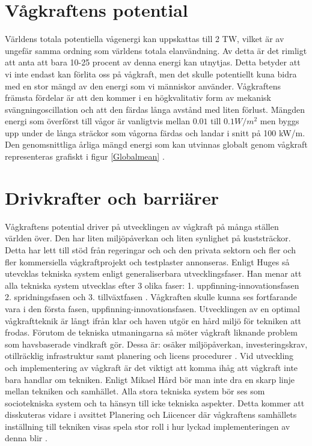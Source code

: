\documentclass[10pt,a4paper,oneside]{article}
\begin{document}
\section{Vågkraftens potential}
Världens totala potentiella vågenergi kan uppskattas till 2 TW, vilket är av ungefär samma ordning som världens totala elanvändning. Av detta är det rimligt att anta att bara 10-25 procent av denna energi kan utnytjas. Detta betyder att vi inte endast kan förlita oss på vågkraft, men det skulle potentiellt kuna bidra med en stor mängd av den energi som vi människor använder. Vågkraftens främsta fördelar är att den kommer i en högkvalitativ form av mekanisk svängningoscillation och att den färdas långa avstånd med liten förlust. Mängden energi som överförst till vågor är vanligtvis mellan \begin{math} 0.01  \end{math} till \begin{math} 0.1 W/m^2 \end{math} men byggs upp under de långa sträckor som vågorna färdas och landar i snitt på 100 kW/m. Den genomsnittliga årliga mängd energi som kan utvinnas globalt genom vågkraft representeras grafiskt i figur \ref{Globalmean} \citep{Cruz}. 

\section{Drivkrafter och barriärer}
Vågkraftens potential driver på utvecklingen av vågkraft på många ställen världen över. Den har liten miljöpåverkan och liten synlighet på kuststräckor. Detta har lett till stöd från regeringar och och den privata sektorn och fler och fler kommersiella vågkraftprojekt och testplaster annonseras. Enligt Huges så utevcklas tekniska system enligt generaliserbara utvecklingsfaser. Han menar att alla tekniska system utvecklas efter 3 olika faser: 1. uppfinning-innovationsfasen  2. spridningsfasen och 3. tillväxtfasen \cite{Summerton}. Vågkraften skulle kunna ses fortfarande vara i den första fasen, uppfinning-innovationsfasen. Utvecklingen av en optimal vågkraftteknik är långt ifrån klar och haven utgör en hård miljö för tekniken att frodas. Förutom de tekniska utmaningarna så möter vågkraft liknande problem som havsbaserade vindkraft gör. Dessa är: osäker miljöpåverkan, investeringskrav, otillräcklig infrastruktur samt planering och licens procedurer \cite{IRENA}. Vid utveckling och implementering av vågkraft är det viktigt att komma ihåg att vågkraft inte bara handlar om tekniken. Enligt Mikael Hård bör man inte dra en skarp linje mellan tekniken och samhället. Alla stora tekniska system bör ses som sociotekniska system och ta hänsyn till icke tekniska aspekter. Detta kommer att disskuteras vidare i avsittet Planering och Liicencer där vågkraftens samhällets inställning till tekniken visas spela stor roll i hur lyckad implementeringen av denna blir \cite{Hård}. 
\end{document}
